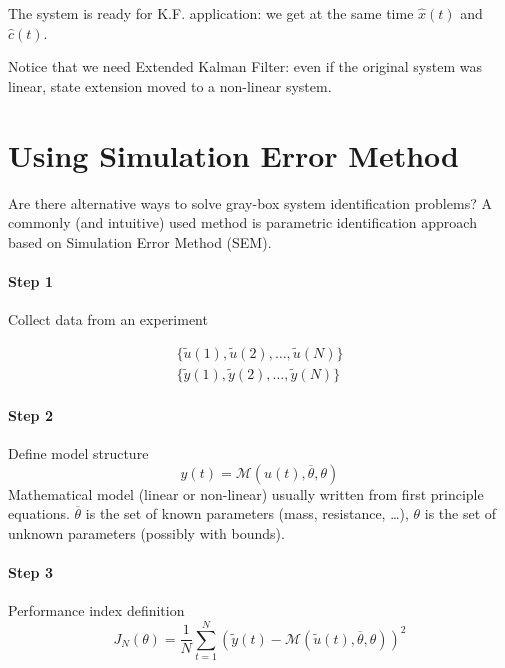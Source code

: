 \begin{example}
    The system is ready for K.F. application: we get at the same time $\hat{x}(t)$ and $\hat{c}(t)$.

    Notice that we need Extended Kalman Filter: even if the original system was linear, state extension moved to a non-linear system.
\end{example}


\section{Using Simulation Error Method}

Are there alternative ways to solve gray-box system identification problems?
A commonly (and intuitive) used method is parametric identification approach based on Simulation Error Method (SEM).

\begin{figure}[H]
    \centering
\end{figure}

\paragraph{Step 1} Collect data from an experiment

\begin{align*}
    \{ \tilde{u}(1), \tilde{u}(2), \dots, \tilde{u}(N) \} \\
    \{ \tilde{y}(1), \tilde{y}(2), \dots, \tilde{y}(N) \}
\end{align*}

\paragraph{Step 2} Define model structure
\[
    y(t) = \mathcal{M}(u(t), \overline{\theta}, \theta)
\]
Mathematical model (linear or non-linear) usually written from first principle equations. $\overline{\theta}$ is the set of known parameters (mass, resistance, \dots), $\theta$ is the set of unknown parameters (possibly with bounds).

\paragraph{Step 3} Performance index definition
\[
    J_N(\theta) = \frac{1}{N} \sum_{t=1}^N \left( \tilde{y}(t) - \mathcal{M}(\tilde{u}(t), \overline{\theta}, \theta) \right)^2
\]

